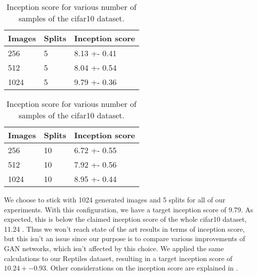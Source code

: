 \begin{table}[H]
\centering
\setlength{\tabcolsep}{0.5em} %

\begin{subtable}{.5\textwidth}
\centering

\begin{tabular}{l l l}
\toprule
Images & Splits & Inception score  \\ 
\midrule
      256  & 5 & 8.13 +- 0.41 \\   
      512  & 5 & 8.04 +- 0.54 \\ 
      1024 & 5 & 9.79 +- 0.36 \\
\bottomrule
\end{tabular}

\end{subtable}%
\begin{subtable}{.5\textwidth}
\centering

\begin{tabular}{l l l}
\toprule
Images & Splits & Inception score  \\ 
\midrule
      256  & 10 & 6.72 +- 0.55 \\   
      512  & 10 & 7.92 +- 0.56\\ 
      1024 & 10 & 8.95 +- 0.44 \\
\bottomrule
\end{tabular}
\end{subtable}%
%
\vspace{0.3cm}
\caption{Inception score for various number of samples of the cifar10 dataset.}
\label{table:exp-isc}
\end{table}%
We choose to stick with 1024 generated images and 5 splits for all of our experiments. With this configuration, we have a target inception score of 9.79. As expected, this is below the claimed inception score of the whole cifar10 dataset, 11.24 \cite{salimans2016improved}. Thus we won't reach state of the art results in terms of inception score, but this isn't an issue since our purpose is to compare various improvements of GAN networks, which isn't affected by this choice. We applied the same calculations to our Reptiles dataset, resulting in a target inception score of $10.24 +- 0.93$. Other considerations on the inception score are explained in \cite{barratt2018note}.







